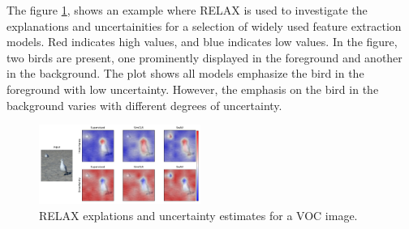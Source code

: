 The figure \ref{fig:relax}, shows an example where RELAX is used to investigate the explanations and uncertainities for a selection of widely used feature extraction models. Red indicates high values, and blue indicates low values. In the figure, two birds are present, one prominently displayed in the foreground and another in the background. The plot shows all models emphasize the bird in the foreground with low uncertainty. However, the emphasis on the bird in the background varies with different degrees of uncertainty. 
\begin{figure}[h]
    \centering
    \includegraphics[width=0.47\textwidth]{./images/VOCexample.pdf}
    \caption{RELAX explations and uncertainty estimates for a VOC image.}
    \label{fig:relax}
\end{figure}

